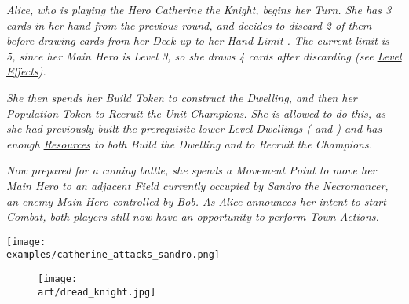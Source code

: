 \begin{multicols}{2}
\textit{Alice, who is playing the Hero Catherine the Knight, begins her Turn.
She has 3 cards in her hand from the previous round, and decides to discard 2 of them before drawing cards from her Deck up to her Hand Limit .
The current limit is 5, since her Main Hero is Level 3, so she draws 4 cards after discarding (see \hyperlink{Level}{Level Effects}).}\par
\textit{She then spends her Build Token to construct the  Dwelling, and then her Population Token to \hyperlink{Units}{Recruit} the  Unit Champions.
She is allowed to do this, as she had previously built the prerequisite lower Level Dwellings ( and ) and has enough \hyperlink{Resources}{Resources} to both Build the Dwelling and to Recruit the Champions.}\par
\textit{Now prepared for a coming battle, she spends a Movement Point to move her Main Hero to an adjacent Field currently occupied by Sandro the Necromancer, an enemy Main Hero controlled by Bob.
As Alice announces her intent to start Combat, both players still now have an opportunity to perform Town Actions.}\par

\texttt{[image: \\examples/catherine\_attacks\_sandro.png]}

\end{multicols}

\vfill

\begin{figure*}[!hb]
  \centering
  \texttt{[image: \\art/dread\_knight.jpg]}
\end{figure*}
\vfill
